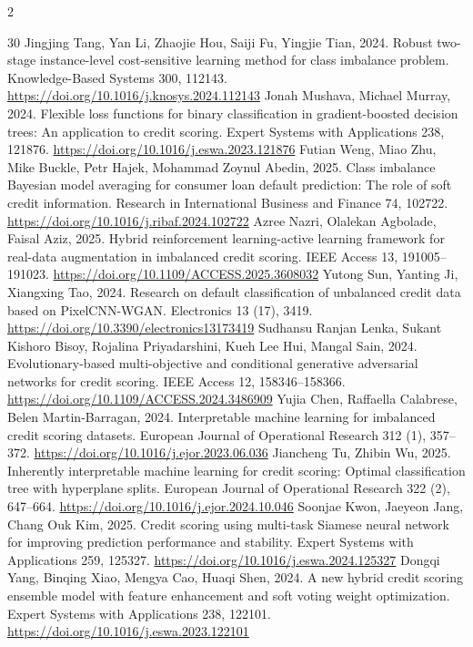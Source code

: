 \documentclass[12pt]{article}
\begin{document}
\begin{singlespace}
{\begin{multicols}{2}
\begin{thebibliography}{30}
 Jingjing Tang, Yan Li, Zhaojie Hou, Saiji Fu, Yingjie Tian, 2024. Robust two-stage instance-level cost-sensitive learning method for class imbalance problem. Knowledge-Based Systems 300, 112143. \url{https://doi.org/10.1016/j.knosys.2024.112143}
 Jonah Mushava, Michael Murray, 2024. Flexible loss functions for binary classification in gradient-boosted decision trees: An application to credit scoring. Expert Systems with Applications 238, 121876. \url{https://doi.org/10.1016/j.eswa.2023.121876}
 Futian Weng, Miao Zhu, Mike Buckle, Petr Hajek, Mohammad Zoynul Abedin, 2025. Class imbalance Bayesian model averaging for consumer loan default prediction: The role of soft credit information. Research in International Business and Finance 74, 102722. \url{https://doi.org/10.1016/j.ribaf.2024.102722}
 Azree Nazri, Olalekan Agbolade, Faisal Aziz, 2025. Hybrid reinforcement learning-active learning framework for real-data augmentation in imbalanced credit scoring. IEEE Access 13, 191005--191023. \url{https://doi.org/10.1109/ACCESS.2025.3608032}
 Yutong Sun, Yanting Ji, Xiangxing Tao, 2024. Research on default classification of unbalanced credit data based on PixelCNN-WGAN. Electronics 13 (17), 3419. \url{https://doi.org/10.3390/electronics13173419}
 Sudhansu Ranjan Lenka, Sukant Kishoro Bisoy, Rojalina Priyadarshini, Kueh Lee Hui, Mangal Sain, 2024. Evolutionary-based multi-objective and conditional generative adversarial networks for credit scoring. IEEE Access 12, 158346--158366. \url{https://doi.org/10.1109/ACCESS.2024.3486909}
 Yujia Chen, Raffaella Calabrese, Belen Martin-Barragan, 2024. Interpretable machine learning for imbalanced credit scoring datasets. European Journal of Operational Research 312 (1), 357--372. \url{https://doi.org/10.1016/j.ejor.2023.06.036}
 Jiancheng Tu, Zhibin Wu, 2025. Inherently interpretable machine learning for credit scoring: Optimal classification tree with hyperplane splits. European Journal of Operational Research 322 (2), 647--664. \url{https://doi.org/10.1016/j.ejor.2024.10.046}
 Soonjae Kwon, Jaeyeon Jang, Chang Ouk Kim, 2025. Credit scoring using multi-task Siamese neural network for improving prediction performance and stability. Expert Systems with Applications 259, 125327. \url{https://doi.org/10.1016/j.eswa.2024.125327}
 Dongqi Yang, Binqing Xiao, Mengya Cao, Huaqi Shen, 2024. A new hybrid credit scoring ensemble model with feature enhancement and soft voting weight optimization. Expert Systems with Applications 238, 122101. \url{https://doi.org/10.1016/j.eswa.2023.122101}

\end{thebibliography}
\end{multicols}}
\end{singlespace}
\end{document}
